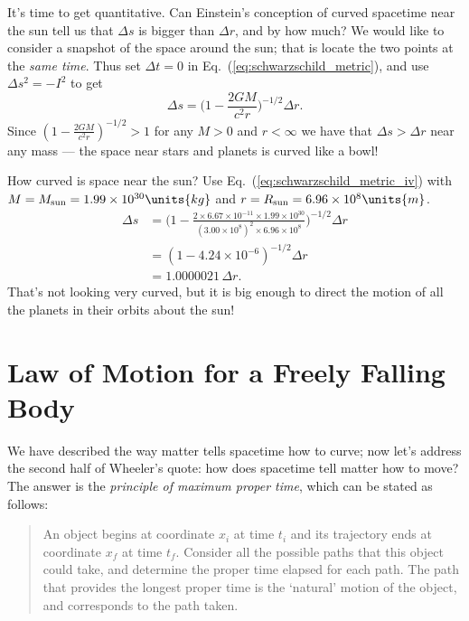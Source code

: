      
It's time to get quantitative.  Can Einstein's conception of curved
spacetime near the sun tell us that $\Delta s$ is bigger than $\Delta
r$, and by how much? We would like to consider a snapshot of the space around the sun; that
is locate the two points at the \textit{same time}.  Thus set $\Delta
t=0$ in
Eq.~(\ref{eq:schwarzschild_metric}), and use
$\Delta s^2=-I^2$ to get
\begin{equation}
  \Delta s = \biggl(1-\frac{2GM}{c^2 r}\biggr)^{-1/2}\Delta r.
\label{eq:schwarzschild_metric_iv}
\end{equation}
Since $(1-\frac{2GM}{c^2r})^{-1/2} > 1$ for any $M>0$ and $r<\infty$
we have that $\Delta s>\Delta r$ near any mass --- the space near
stars and planets is curved like a bowl!

\begin{example}{}
How curved is space near the sun?
\solution
Use Eq.~(\ref{eq:schwarzschild_metric_iv}) with $M=M_\text{sun}=
1.99\times 10^{30}\units{kg}$ and $r=R_\text{sun}=6.96\times
10^{8}\units{m}$.
\begin{align}
\Delta s &= \biggl(1-\frac{2\times 6.67\times 10^{-11}\times 1.99\times
  10^{30}}{(3.00\times 10^{8})^2\times 6.96\times
  10^8}\biggr)^{-1/2}\Delta r \nonumber\\
 &= (1-4.24\times 10^{-6})^{-1/2}\Delta r \nonumber\\
 &= 1.0000021\,\Delta r.
\end{align}
That's not looking very curved, but it is big enough to direct the
motion of all the planets in their orbits about the sun!
\end{example}


\section{Law of Motion for a Freely Falling Body}
     
We have described the way matter tells spacetime how to curve; now
let's address the second half of Wheeler's quote: how does spacetime tell
matter how to move?  The answer is the \textit{principle of maximum
proper time}, which can be stated as follows:
\begin{quote}
  An object begins at
coordinate $x_i$ at time $t_i$ and its trajectory ends at coordinate
$x_f$ at time $t_f$.  Consider all the possible paths
that this object could take, and determine the proper time elapsed for
each path.  The path that provides the longest proper time is the
`natural' motion of the object, and corresponds to the path taken.
\end{quote}

